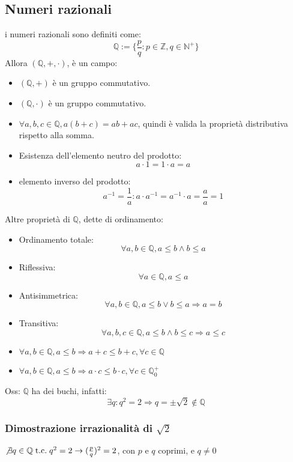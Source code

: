 \documentclass[a4paper,12pt]{article}
\begin{document}
	\subsection{Numeri razionali}
	i numeri razionali sono definiti come:
	\[\mathbb{Q} := \{\frac{p}{q} : p \in \mathbb{Z}, q \in \mathbb{N}^+\}\]
	Allora $(\mathbb{Q}, +, \cdot)$, è un campo:
	\begin{itemize}
		\item $(\mathbb{Q}, +)$ è un gruppo commutativo.
		\item $(\mathbb{Q}, \cdot)$ è un gruppo commutativo.
		\item $\forall a,b,c \in \mathbb{Q}, a(b+c) = ab + ac$, quindi è valida la proprietà distributiva rispetto alla somma.
		\item Esistenza dell'elemento neutro del prodotto:
		\[a \cdot 1 = 1 \cdot a = a\]
		\item elemento inverso del prodotto:
		\[a^{-1} = \frac{1}{a}: a \cdot a^{-1} = a^{-1} \cdot a = \frac{a}{a} = 1\]
	\end{itemize}
	Altre proprietà di $\mathbb{Q}$, dette di ordinamento:
	\begin{itemize}
		\item Ordinamento totale: 
		\[\forall a,b \in \mathbb{Q}, a \leq b \wedge b \leq a\]
		\item Riflessiva:
		\[\forall a \in \mathbb{Q}, a \leq a\]
		\item Antisimmetrica:
		\[\forall a, b \in \mathbb{Q}, a \leq b \vee b\leq a \Rightarrow a = b\]
		\item Transitiva:
		\[\forall a,b,c \in \mathbb{Q}, a \leq b \wedge b \leq c \Rightarrow a \leq c\]
		\item $\forall a,b \in \mathbb{Q}, a \leq b \Rightarrow a+ c \leq b +c, \forall c \in \mathbb{Q}$
		\item $\forall a,b \in \mathbb{Q}, a \leq b \Rightarrow a \cdot c \leq b \cdot c, \forall c \in \mathbb{Q}_0^+$
	\end{itemize}
	
	Oss: $\mathbb{Q}$ ha dei buchi, infatti:
	\[\exists q : q^2 = 2 \Rightarrow q = \pm \sqrt{2} \not \in \mathbb{Q}\]
	
	\subsubsection{Dimostrazione irrazionalità di $\sqrt{2}$}
	\begin{proposition}
		$\not \exists q \in \mathbb{Q} \;\text{t.c.}\; q^2 = 2 \rightarrow (\frac{p}{q})^2 = 2$, con $p$ e $q$ coprimi, e $q \not = 0$
	\end{proposition}
	
\end{document}

